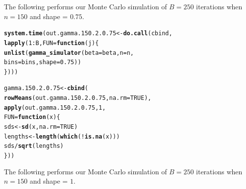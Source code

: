 \documentclass[11pt]{article}\usepackage[]{graphicx}\usepackage[]{color}
\makeatletter
\newcommand{\hlnum}[1]{\textcolor[rgb]{0.686,0.059,0.569}{#1}}%
\newcommand{\hlopt}[1]{\textcolor[rgb]{0,0,0}{#1}}%
\newcommand{\hlstd}[1]{\textcolor[rgb]{0.345,0.345,0.345}{#1}}%
\newcommand{\hlkwa}[1]{\textcolor[rgb]{0.161,0.373,0.58}{\textbf{#1}}}%
\newcommand{\hlkwb}[1]{\textcolor[rgb]{0.69,0.353,0.396}{#1}}%
\newcommand{\hlkwc}[1]{\textcolor[rgb]{0.333,0.667,0.333}{#1}}%
\newcommand{\hlkwd}[1]{\textcolor[rgb]{0.737,0.353,0.396}{\textbf{#1}}}%
\newenvironment{kframe}{%
 \def\at@end@of@kframe{}%
 \ifinner\ifhmode%
  \def\at@end@of@kframe{\end{minipage}}%
  \begin{minipage}{\columnwidth}%
 \fi\fi%
 \def\FrameCommand##1{\hskip\@totalleftmargin \hskip-\fboxsep
 \colorbox{shadecolor}{##1}\hskip-\fboxsep
     \hskip-\linewidth \hskip-\@totalleftmargin \hskip\columnwidth}%
 \MakeFramed {\advance\hsize-\width
   \@totalleftmargin\z@ \linewidth\hsize
   \@setminipage}}%
 {\par\unskip\endMakeFramed%
 \at@end@of@kframe}
\newenvironment{knitrout}{}{} %
\makeatother
\begin{document}
The following performs our Monte Carlo simulation of $B = 250$ iterations 
when $n = 150$ and shape = $0.75$.

\begin{knitrout}
\color{fgcolor}\begin{kframe}
\begin{alltt}
\hlkwd{system.time}\hlstd{(out.gamma.150.2.0.75} \hlkwb{<-} \hlkwd{do.call}\hlstd{(cbind,}
  \hlkwd{lapply}\hlstd{(}\hlnum{1}\hlopt{:}\hlstd{B,} \hlkwc{FUN} \hlstd{=} \hlkwa{function}\hlstd{(}\hlkwc{j}\hlstd{)\{}
    \hlkwd{unlist}\hlstd{(}\hlkwd{gamma_simulator}\hlstd{(}\hlkwc{beta} \hlstd{= beta,} \hlkwc{n} \hlstd{= n,}
      \hlkwc{bins} \hlstd{= bins,} \hlkwc{shape} \hlstd{=} \hlnum{0.75}\hlstd{))}
\hlstd{\})))}
\end{alltt}


{\ttfamily\noindent\bfseries\color{errorcolor}{\#\# Error in eval(family\$initialize): non-positive values not allowed for the 'gamma' family}}

{\ttfamily\noindent\itshape\color{messagecolor}{\#\# Timing stopped at: 0.52 0 0.521}}\end{kframe}
\end{knitrout}

\begin{knitrout}
\color{fgcolor}\begin{kframe}
\begin{alltt}
\hlstd{gamma.150.2.0.75} \hlkwb{<-} \hlkwd{cbind}\hlstd{(}
  \hlkwd{rowMeans}\hlstd{(out.gamma.150.2.0.75,} \hlkwc{na.rm} \hlstd{=} \hlnum{TRUE}\hlstd{),}
  \hlkwd{apply}\hlstd{(out.gamma.150.2.0.75,} \hlnum{1}\hlstd{,}
  \hlkwc{FUN} \hlstd{=} \hlkwa{function}\hlstd{(}\hlkwc{x}\hlstd{)\{}
    \hlstd{sds} \hlkwb{<-} \hlkwd{sd}\hlstd{(x,} \hlkwc{na.rm} \hlstd{=} \hlnum{TRUE}\hlstd{)}
    \hlstd{lengths} \hlkwb{<-} \hlkwd{length}\hlstd{(}\hlkwd{which}\hlstd{(}\hlopt{!}\hlkwd{is.na}\hlstd{(x)))}
    \hlstd{sds} \hlopt{/} \hlkwd{sqrt}\hlstd{(lengths)}
  \hlstd{\}))}
\end{alltt}


{\ttfamily\noindent\bfseries\color{errorcolor}{\#\# Error in is.data.frame(x): object 'out.gamma.150.2.0.75' not found}}\end{kframe}
\end{knitrout}

The following performs our Monte Carlo simulation of $B = 250$ iterations 
when $n = 150$ and shape = $1$.
\end{document}
